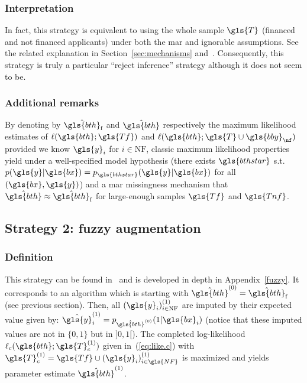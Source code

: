 \subsubsection{Interpretation}
In fact, this strategy is equivalent to using the whole sample $\gls{T}$ (financed and not financed applicants) under both the \gls{mar} and ignorable assumptions. See the related explanation in Section~\ref{sec:mechanisms} and~\cite{zadrozny2004learning}. Consequently, this strategy is truly a particular ``reject inference'' strategy although it does not seem to be.

\subsubsection{Additional remarks}
By denoting by $\hat{\gls{bth}}_\text{f}$ and $\hat{\gls{bth}}$ respectively the maximum likelihood estimates of $\ell(\gls{bth};\gls{Tf})$ and $\ell(\gls{bth};\gls{T} \cup \gls{bby}_{\nf})$ provided we know $\gls{y}_i$ for $i \in \text{NF}$, classic maximum likelihood properties~\cite{10.2307/1912526,zadrozny2004learning} yield under a well-specified model hypothesis (there exists $\gls{bthstar}$ s.t.\ $p(\gls{y} | \gls{bx}) = p_{\gls{bthstar}}(\gls{y} | \gls{bx})$ for all $(\gls{bx},\gls{y})$) and a \gls{mar} missingness mechanism that $\hat{\gls{bth}} \approx \hat{\gls{bth}}_\text{f}$ for large-enough samples $\gls{Tf}$ and $\gls{Tnf}$.



\subsection{Strategy 2: fuzzy augmentation}

\subsubsection{Definition}
This strategy can be found in~\cite{economix} and is developed in depth in Appendix~\ref{fuzzy}. It corresponds to an algorithm which is starting with $\hat{\gls{bth}}^{(0)} = \hat{\gls{bth}}_\text{f}$ (see previous section). Then, all $(\gls{y}_i)^{(1)}_{i \in \text{NF}}$ are imputed by their expected value given by: $\hat{\gls{y}}^{(1)}_i = p_{\hat{\gls{bth}}^{(0)}}(1 | \gls{bx}_i)$ (notice that these imputed values are not in $\{0,1\}$ but in $]0,1[$). The completed log-likelihood $\ell_c(\gls{bth};\gls{T}_c^{(1)})$ given in~(\ref{eq:like.c}) with $\gls{T}_c^{(1)}=\gls{Tf} \cup (\gls{y}_i)^{(1)}_{i \in \gls{NF}}$ is maximized and yields parameter estimate $\hat{\gls{bth}}^{(1)}$.

